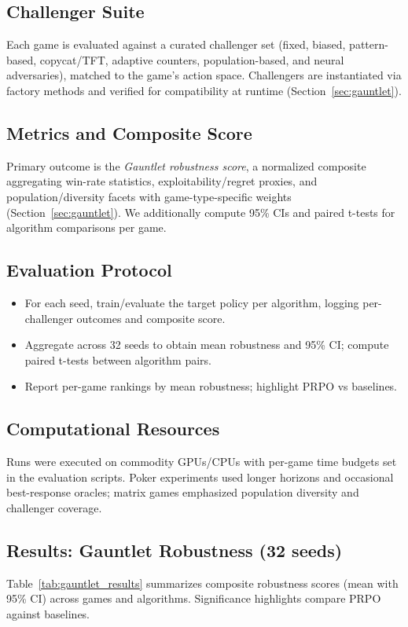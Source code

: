 \documentclass[sigconf,anonymous]{aamas}
\begin{document}
\subsection{Challenger Suite}
Each game is evaluated against a curated challenger set (fixed, biased, pattern-based, copycat/TFT, adaptive counters, population-based, and neural adversaries), matched to the game's action space. Challengers are instantiated via factory methods and verified for compatibility at runtime (Section~\ref{sec:gauntlet}).

\subsection{Metrics and Composite Score}
Primary outcome is the \emph{Gauntlet robustness score}, a normalized composite aggregating win-rate statistics, exploitability/regret proxies, and population/diversity facets with game-type-specific weights (Section~\ref{sec:gauntlet}). We additionally compute 95\% CIs and paired t-tests for algorithm comparisons per game.

\subsection{Evaluation Protocol}
\begin{itemize}
    \item For each seed, train/evaluate the target policy per algorithm, logging per-challenger outcomes and composite score.
    \item Aggregate across 32 seeds to obtain mean robustness and 95\% CI; compute paired t-tests between algorithm pairs.
    \item Report per-game rankings by mean robustness; highlight PRPO vs baselines.
\end{itemize}

\subsection{Computational Resources}
Runs were executed on commodity GPUs/CPUs with per-game time budgets set in the evaluation scripts. Poker experiments used longer horizons and occasional best-response oracles; matrix games emphasized population diversity and challenger coverage.

\subsection{Results: Gauntlet Robustness (32 seeds)}
Table~\ref{tab:gauntlet_results} summarizes composite robustness scores (mean with 95\% CI) across games and algorithms. Significance highlights compare PRPO against baselines.
\end{document}
